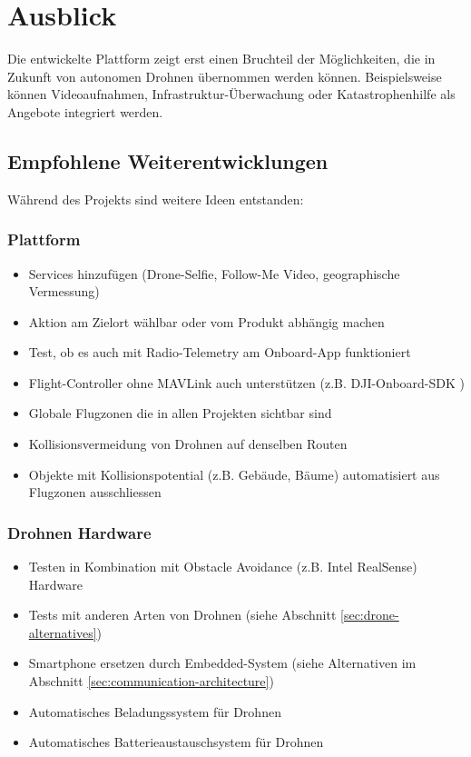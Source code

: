 \newpage
\section{Ausblick}

Die entwickelte Plattform zeigt erst einen Bruchteil der Möglichkeiten, die in Zukunft von autonomen Drohnen übernommen werden können. Beispielsweise können Videoaufnahmen, Infrastruktur-Überwachung oder Katastrophenhilfe als Angebote integriert werden. 

\subsection{Empfohlene Weiterentwicklungen}

Während des Projekts sind weitere Ideen entstanden: 

\subsubsection{Plattform}

\begin{itemize}
	\item Services hinzufügen (Drone-Selfie, Follow-Me Video, geographische Vermessung)
	\item Aktion am Zielort wählbar oder vom Produkt abhängig machen
	\item Test, ob es auch mit Radio-Telemetry am Onboard-App funktioniert
	\item \Gls{Flight-Controller} ohne \Gls{MAVLink} auch unterstützen (z.B. DJI-Onboard-SDK \cite{dji-sdk})
	\item Globale Flugzonen die in allen Projekten sichtbar sind
	\item Kollisionsvermeidung von Drohnen auf denselben Routen
	\item Objekte mit Kollisionspotential (z.B. Gebäude, Bäume) automatisiert aus Flugzonen ausschliessen
\end{itemize}

\subsubsection{Drohnen Hardware} 
\begin{itemize}
	\item Testen in Kombination mit Obstacle Avoidance (z.B. Intel RealSense\cite{realsense}) Hardware
		\item Tests mit anderen Arten von Drohnen (siehe Abschnitt \ref{sec:drone-alternatives})
	\item Smartphone ersetzen durch Embedded-System (siehe Alternativen im Abschnitt \ref{sec:communication-architecture}) 

	\item Automatisches Beladungssystem für Drohnen
	\item Automatisches Batterieaustauschsystem für Drohnen
\end{itemize}  



